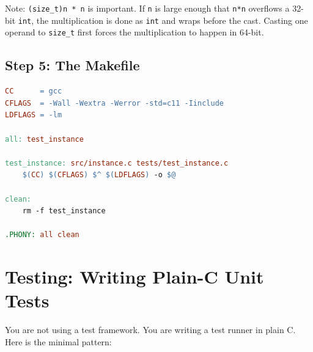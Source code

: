 \documentclass[11pt]{article}
\begin{document}
Note: \texttt{(size\_t)n * n} is important. If \texttt{n} is large enough that \texttt{n*n} overflows a 32-bit \texttt{int}, the multiplication is done as \texttt{int} and wraps before the cast. Casting one operand to \texttt{size\_t} first forces the multiplication to happen in 64-bit.

\subsection{Step 5: The Makefile}

\begin{lstlisting}[style=cstyle, language=make]
CC      = gcc
CFLAGS  = -Wall -Wextra -Werror -std=c11 -Iinclude
LDFLAGS = -lm

all: test_instance

test_instance: src/instance.c tests/test_instance.c
	$(CC) $(CFLAGS) $^ $(LDFLAGS) -o $@

clean:
	rm -f test_instance

.PHONY: all clean
\end{lstlisting}

\newpage

\section{Testing: Writing Plain-C Unit Tests}

You are not using a test framework. You are writing a test runner in plain C. Here is the minimal pattern:
\end{document}
